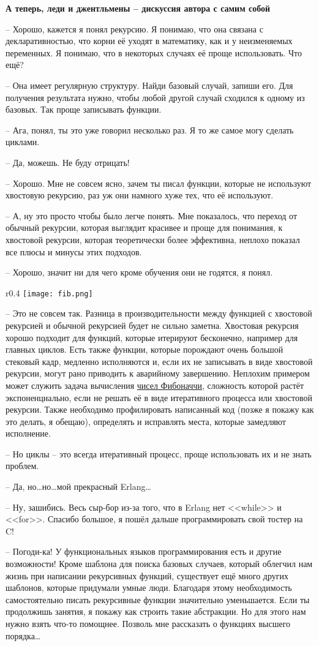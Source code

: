 \textbf{А теперь, леди и джентльмены \--- дискуссия автора с самим собой}

\--- Хорошо, кажется я понял рекурсию. Я понимаю, что она связана с декларативностью, что корни её уходят в математику, как и у неизменяемых переменных. Я понимаю, что в некоторых случаях её проще использовать. Что ещё?

\--- Она имеет регулярную структуру. Найди базовый случай, запиши его. Для получения результата нужно, чтобы любой другой случай сходился к одному из базовых. Так проще записывать функции.

\--- Ага, понял, ты это уже говорил несколько раз. Я то же самое могу сделать циклами.

\--- Да, можешь. Не буду отрицать!

\--- Хорошо. Мне не совсем ясно, зачем ты писал функции, которые не используют хвостовую рекурсию, раз уж они намного хуже тех, что её используют.

\--- А, ну это просто чтобы было легче понять. Мне показалось, что переход от обычный рекурсии, которая выглядит красивее и проще для понимания, к хвостовой рекурсии, которая теоретически более эффективна, неплохо показал все плюсы и минусы этих подходов.

\--- Хорошо, значит ни для чего кроме обучения они не годятся, я понял.
\begin{wrapfigure}{r}{0.4\linewidth}
    \texttt{[image: fib.png]}
\end{wrapfigure}

\--- Это не совсем так. Разница в производительности между функцией с хвостовой рекурсией и обычной рекурсией будет не сильно заметна. Хвостовая рекурсия хорошо подходит для функций, которые итерируют бесконечно, например для главных циклов. Есть также функции, которые порождают очень большой стековый кадр, медленно исполняются и, если их не записывать в виде хвостовой рекурсии, могут рано приводить к аварийному завершению. Неплохим примером может служить задача вычисления \href{http://en.wikipedia.org/wiki/Fibonacci\_number}{чисел Фибоначчи}, сложность которой растёт экспоненциально, если не решать её в виде итеративного процесса или хвостовой рекурсии. Также необходимо профилировать написанный код (позже я покажу как это делать, я обещаю), определять и исправлять места, которые замедляют исполнение.

\--- Но циклы \--- это всегда итеративный процесс, проще использовать их и не знать проблем.

\--- Да, но\ldots но\ldots мой прекрасный Erlang\ldots

\--- Ну, зашибись. Весь сыр\--бор из\--за того, что в Erlang нет <<while>> и <<for>>. Спасибо большое, я пошёл дальше программировать свой тостер на C!

\--- Погоди\--ка! У функциональных языков программирования есть и другие возможности! Кроме шаблона для поиска базовых случаев, который облегчил нам жизнь при написании рекурсивных функций, существует ещё много других шаблонов, которые придумали умные люди. Благодаря этому необходимость самостоятельно писать рекурсивные функции значительно уменьшается. Если ты продолжишь занятия, я покажу как строить такие абстракции. Но для этого нам нужно взять что\--то помощнее. Позволь мне рассказать о функциях высшего порядка\ldots
